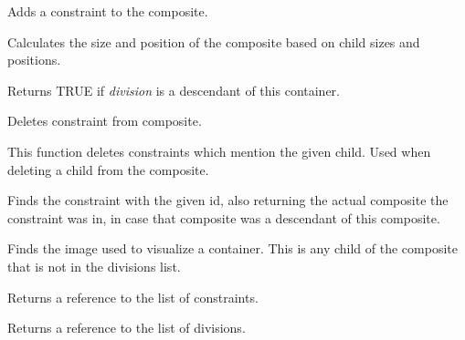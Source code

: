 Adds a constraint to the composite.



Calculates the size and position of the composite based on child sizes and positions.



Returns TRUE if {\it division} is a descendant of this container.



Deletes constraint from composite.



This function deletes constraints which mention the given child. Used when
deleting a child from the composite.



Finds the constraint with the given id, also returning the actual composite the constraint was in,
in case that composite was a descendant of this composite.



Finds the image used to visualize a container. This is any child
of the composite that is not in the divisions list.



Returns a reference to the list of constraints.



Returns a reference to the list of divisions.

